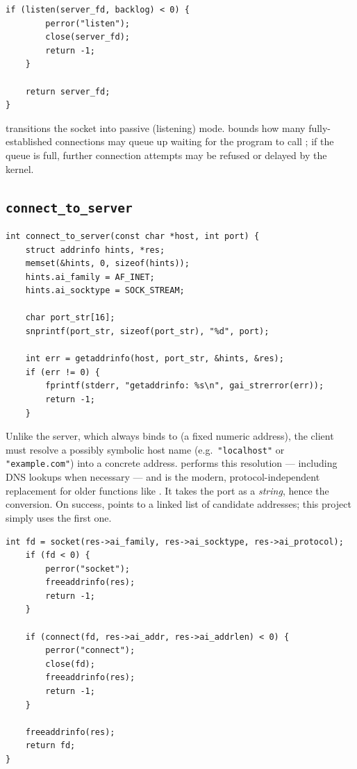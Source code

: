 \begin{lstlisting}[style=cstyle]
    if (listen(server_fd, backlog) < 0) {
        perror("listen");
        close(server_fd);
        return -1;
    }

    return server_fd;
}
\end{lstlisting}

 transitions the socket into passive (listening) mode.  bounds how many fully-established connections may queue up waiting for the program to call ; if the queue is full, further connection attempts may be refused or delayed by the kernel.

\subsection{\texttt{connect\_to\_server}}

\begin{lstlisting}[style=cstyle]
int connect_to_server(const char *host, int port) {
    struct addrinfo hints, *res;
    memset(&hints, 0, sizeof(hints));
    hints.ai_family = AF_INET;
    hints.ai_socktype = SOCK_STREAM;

    char port_str[16];
    snprintf(port_str, sizeof(port_str), "%d", port);

    int err = getaddrinfo(host, port_str, &hints, &res);
    if (err != 0) {
        fprintf(stderr, "getaddrinfo: %s\n", gai_strerror(err));
        return -1;
    }
\end{lstlisting}

Unlike the server, which always binds to  (a fixed numeric address), the client must resolve a possibly symbolic host name (e.g.\ \texttt{"localhost"} or \texttt{"example.com"}) into a concrete address.  performs this resolution --- including DNS lookups when necessary --- and is the modern, protocol-independent replacement for older functions like . It takes the port as a \emph{string}, hence the  conversion. On success,  points to a linked list of candidate addresses; this project simply uses the first one.

\begin{lstlisting}[style=cstyle]
    int fd = socket(res->ai_family, res->ai_socktype, res->ai_protocol);
    if (fd < 0) {
        perror("socket");
        freeaddrinfo(res);
        return -1;
    }

    if (connect(fd, res->ai_addr, res->ai_addrlen) < 0) {
        perror("connect");
        close(fd);
        freeaddrinfo(res);
        return -1;
    }

    freeaddrinfo(res);
    return fd;
}
\end{lstlisting}

